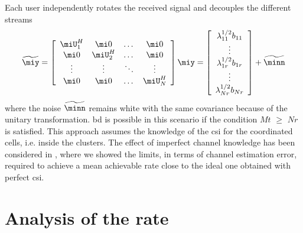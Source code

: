 Each user independently rotates the received signal and decouples the different streams
\begin{equation}
\label{eq:5} \widetilde{\miy}=\left [\begin{array}{cccc}
\miU_1^H & \mi0 &\dots & \mi0\\
\mi0 & \miU_2^H &\dots & \mi0\\
\vdots & \vdots &\ddots & \vdots\\
\mi0 & \mi0 &\dots & \miU_N^H\\
\end{array}\right ]\miy=\left [\begin{array}{c}
\lambda_{11}^{1/2}b_{11}\\
\vdots\\
\lambda_{1r}^{1/2}b_{1r}\\
\vdots\\
\lambda_{Nr}^{1/2}b_{Nr}\\
\end{array}\right ]+ \widetilde{\minn}
\end{equation}
where the noise $\widetilde{\minn}$ remains white with the same covariance because of the unitary transformation. \gls{bd} is possible in this scenario if the condition $Mt$ $\geq$ $Nr$ is satisfied. 
This approach assumes the knowledge of the \gls{csi} for the coordinated cells, i.e. inside the clusters. The effect of imperfect channel knowledge has been considered in \cite{armada11b}, where 
we showed the limits, in terms of channel estimation error, required to achieve a mean achievable rate close to the ideal one obtained with perfect \gls{csi}. 

\section{Analysis of the rate}\label{SINR}

